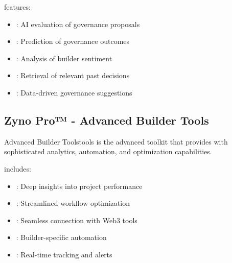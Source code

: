  features:

\begin{itemize}[leftmargin=*]
\item {}: AI evaluation of governance proposals
\item {}: Prediction of governance outcomes
\item {}: Analysis of builder sentiment
\item {}: Retrieval of relevant past decisions
\item {}: Data-driven governance suggestions
\end{itemize}

\subsection{Zyno Pro™ - Advanced Builder Tools}

\begin{mfai-box-activate}{Advanced Builder Tools}{tools}
 is the advanced toolkit that provides  with sophisticated analytics, automation, and optimization capabilities.
\end{mfai-box-activate}

 includes:

\begin{itemize}[leftmargin=*]
\item {}: Deep insights into project performance
\item {}: Streamlined workflow optimization
\item {}: Seamless connection with Web3 tools
\item {}: Builder-specific automation
\item {}: Real-time tracking and alerts
\end{itemize}

\begin{center}
\end{center}

